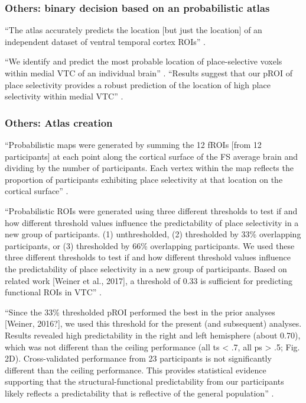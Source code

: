 \subsubsection{Others: binary decision based on an probabilistic atlas}


%
``The atlas accurately predicts the location [but just the location] of an
independent dataset of ventral temporal cortex ROIs''
\citep{rosenke2021probabilistic}.

%
``We identify and predict the most probable location of place-selective voxels
within medial VTC of an individual brain'' \citep{weiner2018defining}.
%
``Results suggest that our pROI of place selectivity provides a robust
prediction of the location of high place selectivity within medial VTC''
\citep{weiner2018defining}.




\subsubsection{Others: Atlas creation}
%
``Probabilistic maps were generated by summing the 12 fROIs [from 12
participants] at each point along the cortical surface of the FS average brain
and dividing by the number of participants.
%
Each vertex within the map reflects the proportion of participants exhibiting
place selectivity at that location on the cortical surface''
\citep{weiner2018defining}.

%
``Probabilistic ROIs were generated using three different thresholds to test if
and how different threshold values influence the predictability of place
selectivity in a new group of participants.
%
(1) unthresholded,
%
(2) thresholded by 33\% overlapping participants, or
%
(3) thresholded by 66\% overlapping participants.
%
We used these three different thresholds to test if and how different threshold
values influence the predictability of place selectivity in a new group of
participants. Based on related work [Weiner et al., 2017], a threshold of 0.33
is sufficient for predicting functional ROIs in VTC''
\citep{weiner2018defining}.

%
``Since the 33\% thresholded pROI performed the best in the prior analyses
[Weiner, 2016?], we used this threshold for the present (and subsequent)
analyses.
%
Results revealed high predictability in the right and left hemisphere (about
0.70), which was not different than the ceiling performance (all ts < .7, all ps
> .5; Fig. 2D).
%
Cross-validated performance from 23 participants is not significantly different
than the ceiling performance.
%
This provides statistical evidence supporting that the structural-functional
predictability from our participants likely reflects a predictability that is
reflective of the general population'' \citep{weiner2018defining}.

